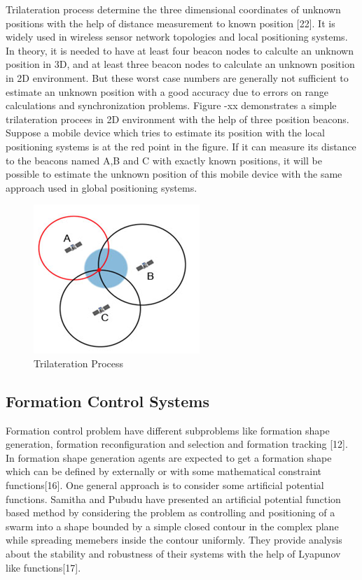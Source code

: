 \documentclass[twoside]{article}
\begin{document}
Trilateration process determine the three dimensional coordinates of unknown positions with the help of distance measurement to known position [22].  It is widely used in wireless sensor network topologies and local positioning systems.  In theory, it is needed to have at least four beacon nodes to calculte an unknown position in 3D, and at least three beacon nodes to calculate an unknown position in 2D environment. But these worst case numbers are generally not sufficient to estimate an unknown position with a good accuracy due to errors on range calculations and synchronization problems. Figure -xx demonstrates a simple trilateration procees in 2D environment with the help of  three position beacons. Suppose a mobile device which tries to estimate its position with the local positioning systems is at the red point in the figure. If it can measure its distance to the beacons named A,B and C with exactly known positions, it will be possible to estimate the unknown position of this mobile device with the same approach used in global positioning systems. 


\begin{figure}[H]
	\caption{Trilateration Process}
	\centering
	\includegraphics[scale = 1]{trilateration}
\end{figure}



\subsection{Formation Control Systems}
Formation control problem have different subproblems like formation shape generation, formation reconfiguration and selection and formation tracking [12].  
In formation shape generation agents are expected to get a formation shape which can be defined by externally or with some mathematical constraint functions[16].  One general approach is to consider some artificial potential functions. Samitha and Pubudu have presented an artificial potential function based method  by considering the problem as controlling and positioning of a swarm into a shape bounded by a simple closed contour in the complex plane while spreading memebers inside the contour uniformly.  They provide analysis about the stability and robustness of their systems with the help of Lyapunov like functions[17].
\end{document}
